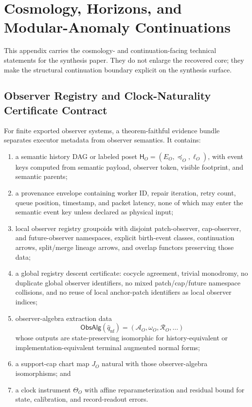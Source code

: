 \section{Cosmology, Horizons, and Modular-Anomaly Continuations}
\label{app:observers-cosmology-port}

This appendix carries the cosmology- and continuation-facing technical statements for the
synthesis paper. They do not enlarge the recovered core; they make the structural continuation
boundary explicit on the synthesis surface.

\subsection{Observer Registry and Clock-Naturality Certificate Contract}
\label{app:observer-registry-clock-contract}

For finite exported observer systems, a theorem-faithful evidence bundle separates executor
metadata from observer semantics. It contains:
\begin{enumerate}[label=(\roman*),leftmargin=2em]
\item a semantic history DAG or labeled poset \(\mathsf H_O=(E_O,\preceq_O,\ell_O)\), with event
keys computed from semantic payload, observer token, visible footprint, and semantic parents;
\item a provenance envelope containing worker ID, repair iteration, retry count, queue position,
timestamp, and packet latency, none of which may enter the semantic event key unless declared as
physical input;
\item local observer registry groupoids with disjoint patch-observer, cap-observer, and
future-observer namespaces, explicit birth-event classes, continuation arrows, split/merge lineage
arrows, and overlap functors preserving those data;
\item a global registry descent certificate: cocycle agreement, trivial monodromy, no duplicate
global observer identifiers, no mixed patch/cap/future namespace collisions, and no reuse of local
anchor-patch identifiers as local observer indices;
\item observer-algebra extraction data
\[
\mathsf{ObsAlg}(\widehat q_{\mathrm{nf}})
=
(\mathcal A_O,\omega_O,\mathcal R_O,\ldots)
\]
whose outputs are state-preserving isomorphic for history-equivalent or implementation-equivalent
terminal augmented normal forms;
\item a support-cap chart map \(J_O\) natural with those observer-algebra isomorphisms; and
\item a clock instrument \(\Theta_O\) with affine reparameterization and residual bound for state,
calibration, and record-readout errors.
\end{enumerate}

